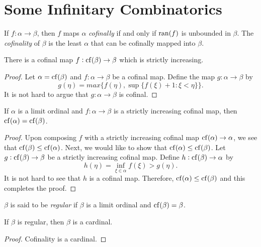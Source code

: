 \section{Some Infinitary Combinatorics}

\begin{definition}[Cofinal]
    If $f:\alpha\to\beta$, then $f$ maps $\alpha$ \emph{cofinally} if and only if $\operatorname{ran}(f)$ is unbounded in $\beta$. The \emph{cofinality} of $\beta$ is the least $\alpha$ that can be cofinally mapped into $\beta$.
\end{definition}

\begin{lemma}
    There is a cofinal map $f:\operatorname{cf}(\beta)\to\beta$ which is strictly increasing.
\end{lemma}
\begin{proof}
    Let $\alpha = \operatorname{cf}(\beta)$ and $f: \alpha\to\beta$ be a cofinal map. Define the map $g:\alpha\to\beta$ by 
    \begin{equation*}
        g(\eta) = max\{f(\eta), \sup\{f(\xi) + 1\colon \xi < \eta\}\}.
    \end{equation*}
    It is not hard to argue that $g:\alpha\to\beta$ is cofinal.
\end{proof}

\begin{lemma}
    If $\alpha$ is a limit ordinal and $f:\alpha\to\beta$ is a strictly increasing cofinal map, then $\operatorname{cf}(\alpha) = \operatorname{cf}(\beta)$.
\end{lemma}
\begin{proof}
    Upon composing $f$ with a strictly increasing cofinal map $\operatorname{cf}(\alpha)\to\alpha$, we see that $\operatorname{cf}(\beta)\le\operatorname{cf}(\alpha)$. Next, we would like to show that $\operatorname{cf}(\alpha)\le\operatorname{cf}(\beta)$. Let $g:\operatorname{cf}(\beta)\to\beta$ be a strictly increasing cofinal map. Define $h:\operatorname{cf}(\beta)\to\alpha$ by 
    \begin{equation*}
        h(\eta) = \inf_{\xi\in\alpha} f(\xi) > g(\eta).
    \end{equation*}
    It is not hard to see that $h$ is a cofinal map. Therefore, $\operatorname{cf}(\alpha)\le\operatorname{cf}(\beta)$ and this completes the proof.
\end{proof}

\begin{definition}
    $\beta$ is said to be \emph{regular} if $\beta$ is a limit ordinal and $\operatorname{cf}(\beta) = \beta$.
\end{definition}

\begin{lemma}
    If $\beta$ is regular, then $\beta$ is a cardinal.
\end{lemma}
\begin{proof}
    Cofinality is a cardinal.
\end{proof}

